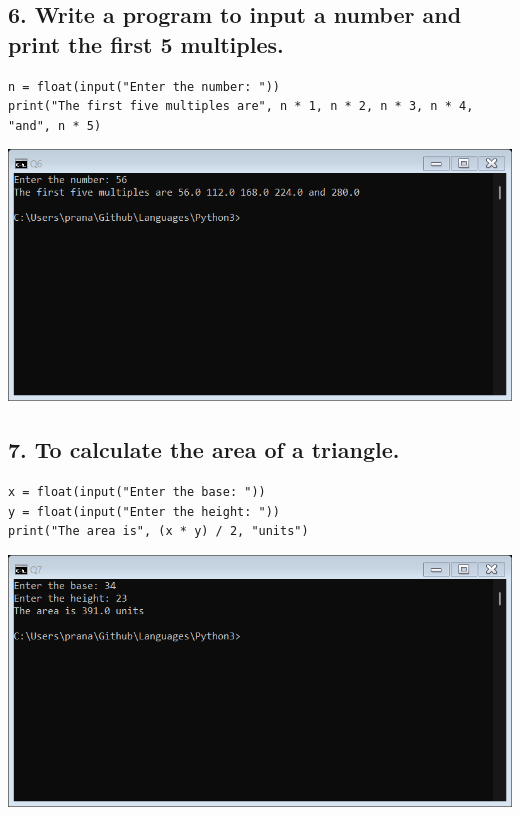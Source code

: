 \documentclass[12pt]{article}
\begin{document}
\subsection*{6. Write a program to input a number and print the first 5 multiples.}
\begin{verbatim}
n = float(input("Enter the number: "))
print("The first five multiples are", n * 1, n * 2, n * 3, n * 4, "and", n * 5)
\end{verbatim}
\includegraphics[width=\linewidth]{images/6.png}

\subsection*{7. To calculate the area of a triangle.}
\begin{verbatim}
x = float(input("Enter the base: "))
y = float(input("Enter the height: "))
print("The area is", (x * y) / 2, "units")
\end{verbatim}
\includegraphics[width=\linewidth]{images/7.png}
\end{document}
